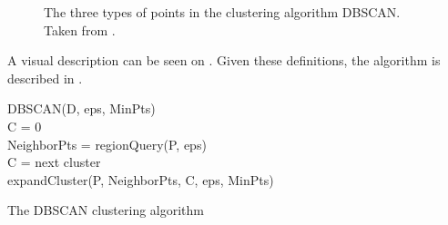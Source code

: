 \begin{figure}
\caption{The three types of points in the clustering algorithm DBSCAN. Taken from \cite[page 528]{pang2006introduction}.}
\label{dbscan_point_types}
\end{figure}

A visual description can be seen on .
Given these definitions, the algorithm is described in .

\begin{algorithm}
DBSCAN(D, eps, MinPts)\\
	C = 0\\
	{
		NeighborPts = regionQuery(P, eps)\\
		{
			C = next cluster\\
			expandCluster(P, NeighborPts, C, eps, MinPts)
		}
	}
\caption{The DBSCAN clustering algorithm}\label{dbscan-algo}
\end{algorithm}


